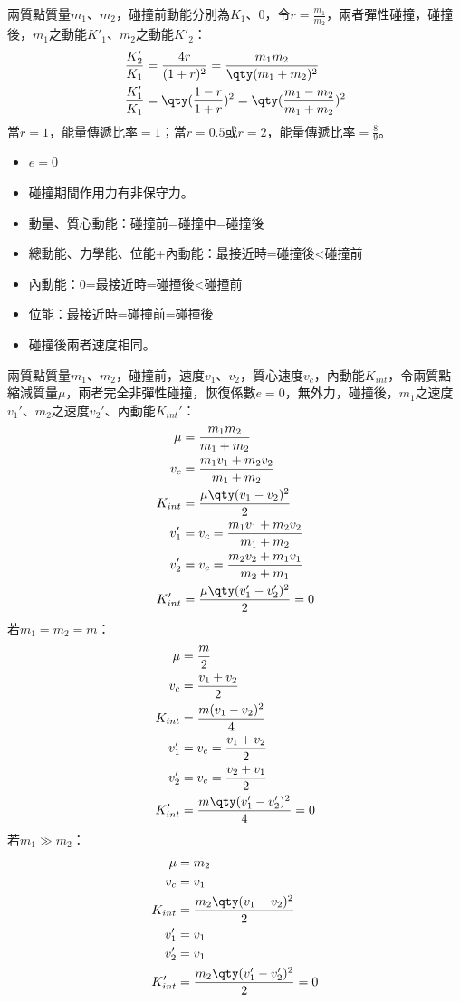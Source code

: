\documentclass[a4paper,12pt]{article}
\begin{document}
兩質點質量$m_1$、$m_2$，碰撞前動能分別為$K_1$、$0$，令$r=\frac{m_1}{m_2}$，兩者彈性碰撞，碰撞後，$m_1$之動能$K'_1$、$m_2$之動能$K'_2$：
\[\begin{aligned}
\frac{K'_2}{K_1} &= \frac{4r}{(1+r)^2} = \frac{m_1m_2}{\qty(m_1+m_2)^2} \\
\frac{K'_1}{K_1} &= \qty(\frac{1-r}{1+r})^2 = \qty(\frac{m_1-m_2}{m_1+m_2})^2
\end{aligned}\]
當$r=1$，能量傳遞比率$=1$；當$r=0.5$或$r=2$，能量傳遞比率$=\frac{8}{9}$。
\begin{itemize}
\item $e=0$
\item 碰撞期間作用力有非保守力。
\item 動量、質心動能：碰撞前=碰撞中=碰撞後
\item 總動能、力學能、位能+內動能：最接近時=碰撞後<碰撞前
\item 內動能：0=最接近時=碰撞後<碰撞前
\item 位能：最接近時=碰撞前=碰撞後
\item 碰撞後兩者速度相同。
\end{itemize}
兩質點質量$m_1$、$m_2$，碰撞前，速度$v_1$、$v_2$，質心速度$v_c$，內動能$K_{int}$，令兩質點縮減質量$\mu$，兩者完全非彈性碰撞，恢復係數$e=0$，無外力，碰撞後，$m_1$之速度$v_1'$、$m_2$之速度$v_2'$、內動能$K_{int}'$：
\[\begin{aligned}
\mu&=\frac{m_1m_2}{m_1+m_2}\\
v_c &= \frac{m_1v_1+m_2v_2}{m_1+m_2} \\
K_{int} &= \frac{\mu\qty(v_1-v_2)^2}{2}\\
v_1' &= v_c = \frac{m_1v_1+m_2v_2}{m_1+m_2} \\
v_2' &= v_c = \frac{m_2v_2+m_1v_1}{m_2+m_1} \\
K_{int}' &= \frac{\mu \qty(v_1'-v_2')^2}{2} = 0
\end{aligned}\]
若$m_1=m_2=m$：
\[\begin{aligned}
\mu&=\frac{m}{2}\\
v_c &= \frac{v_1+v_2}{2} \\
K_{int} &= \frac{m(v_1-v_2)^2}{4}\\
v_1' &= v_c = \frac{v_1+v_2}{2} \\
v_2' &= v_c = \frac{v_2+v_1}{2} \\
K_{int}' &= \frac{m\qty(v_1'-v_2')^2}{4} = 0
\end{aligned}\]
若$m_1\gg m_2$：
\[\begin{aligned}
\mu&=m_2\\
v_c &= v_1 \\
K_{int} &= \frac{m_2\qty(v_1-v_2)^2}{2}\\
v_1' &= v_1 \\
v_2' &= v_1 \\
K_{int}' &= \frac{m_2\qty(v_1'-v_2')^2}{2} = 0
\end{aligned}\]
\end{document}
